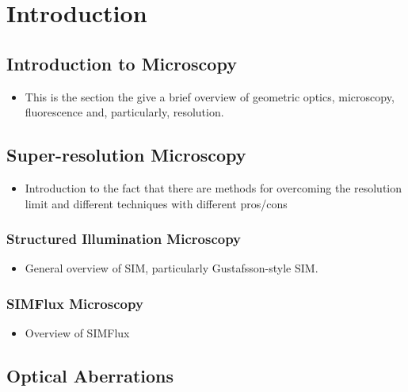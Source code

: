 \chapter{Introduction}

\section{Introduction to Microscopy}
\label{sec:microscopy}

\begin{itemize}
	\item This is the section the give a brief overview of geometric optics, microscopy, fluorescence and, particularly, resolution.
\end{itemize}

\section{Super-resolution Microscopy}
\label{sec:super_res}

\begin{itemize}
	\item Introduction to the fact that there are methods for overcoming the resolution limit and different techniques with different pros/cons
\end{itemize}

	\subsection{Structured Illumination Microscopy}
	\label{subsec:SIM}
	
		\begin{itemize}
			\item General overview of SIM, particularly Gustafsson-style SIM.
		\end{itemize}
	
	\subsection{SIMFlux Microscopy}
	\label{subsec:SIMFlux}
	
		\begin{itemize}
			\item Overview of SIMFlux
		\end{itemize}

\section{Optical Aberrations}
\label{sec:aberrations}

